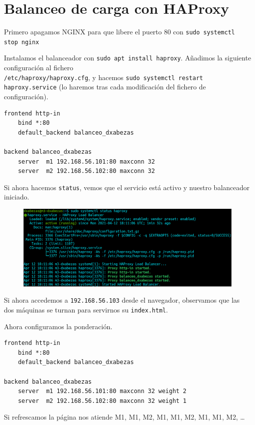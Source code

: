 \documentclass{article}
\begin{document}
\section{Balanceo de carga con HAProxy}

Primero apagamos NGINX para que libere el puerto 80 con \verb^sudo systemctl stop nginx^

Instalamos el balanceador con \verb^sudo apt install haproxy^. Añadimos la siguiente configuración al fichero \\
\texttt{/etc/haproxy/haproxy.cfg}, y hacemos \verb^sudo systemctl restart haproxy.service^ (lo haremos tras cada
modificación del fichero de configuración).

\begin{Verbatim}[tabsize=4]
frontend http-in
	bind *:80
	default_backend balanceo_dxabezas

backend balanceo_dxabezas
	server  m1 192.168.56.101:80 maxconn 32
	server  m2 192.168.56.102:80 maxconn 32
\end{Verbatim}

Si ahora hacemos \texttt{status}, vemos que el servicio está activo y nuestro balanceador iniciado.

\begin{figure}[H]
	\centering
	\includegraphics[width=160mm]{imgs/haproxy-status}
	\label{fig:haproxy-status}
\end{figure}

Si ahora accedemos a \texttt{192.168.56.103} desde el navegador, observamos que las dos máquinas se turnan para
servirnos su \texttt{index.html}.

Ahora configuramos la ponderación.

\begin{Verbatim}[tabsize=4]
frontend http-in
	bind *:80
	default_backend balanceo_dxabezas

backend balanceo_dxabezas
	server  m1 192.168.56.101:80 maxconn 32 weight 2
	server  m2 192.168.56.102:80 maxconn 32 weight 1
\end{Verbatim}
Si refrescamos la página nos atiende M1, M1, M2, M1, M1, M2, M1, M1, M2, \ldots
\end{document}
